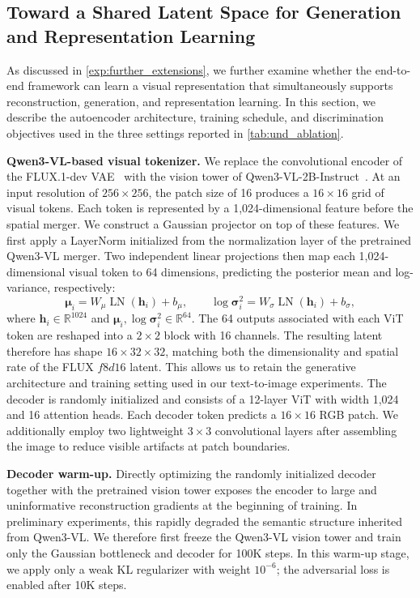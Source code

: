 \subsection{Toward a Shared Latent Space for Generation and Representation Learning}
\label{app:und}

As discussed in \cref{exp:further_extensions}, we further examine whether the
end-to-end framework can learn a visual representation that simultaneously
supports reconstruction, generation, and representation learning. In this section, we
describe the autoencoder architecture, training schedule, and discrimination
objectives used in the three settings reported in
\cref{tab:und_ablation}.

\textbf{Qwen3-VL-based visual tokenizer.}
We replace the convolutional encoder of the FLUX.1-dev VAE~\cite{flux1} with the vision tower of Qwen3-VL-2B-Instruct~\cite{bai2025qwen3}. 
At an input resolution of \(256\times256\), the patch size of 16 produces a \(16\times16\) grid of visual tokens. Each token is represented by a 1,024-dimensional feature before the spatial merger.
We construct a Gaussian projector on top of these features. 
We first apply a LayerNorm initialized from the normalization layer of the pretrained Qwen3-VL merger. 
Two independent linear projections then map each 1,024-dimensional visual token to 64 dimensions, predicting the posterior mean and log-variance, respectively:
\begin{equation*}
    \boldsymbol{\mu}_i =
    W_{\mu}\operatorname{LN}(\mathbf{h}_i)+b_{\mu},
    \qquad
    \log\boldsymbol{\sigma}^{2}_i =
    W_{\sigma}\operatorname{LN}(\mathbf{h}_i)+b_{\sigma},
\end{equation*}
where \(\mathbf{h}_i\in\mathbb{R}^{1024}\) and
\(\boldsymbol{\mu}_i,\log\boldsymbol{\sigma}^{2}_i\in\mathbb{R}^{64}\).
The 64 outputs associated with each ViT token are reshaped into a \(2\times2\) block with 16 channels. 
The resulting latent therefore has shape \(16\times32\times32\), matching both the dimensionality and spatial rate of the FLUX \(f8d16\) latent. 
This allows us to retain the generative architecture and training setting used in our text-to-image experiments.
The decoder is randomly initialized and consists of a 12-layer ViT with width 1,024 and 16 attention heads. 
Each decoder token predicts a \(16\times16\) RGB patch. 
We additionally employ two lightweight \(3\times3\) convolutional layers after assembling the image to reduce visible artifacts at patch boundaries.

\textbf{Decoder warm-up.}
Directly optimizing the randomly initialized decoder together with the pretrained vision tower exposes the encoder to large and uninformative reconstruction gradients at the beginning of training. 
In preliminary experiments, this rapidly degraded the semantic structure inherited from Qwen3-VL. 
We therefore first freeze the Qwen3-VL vision tower and train only the Gaussian bottleneck and decoder for 100K steps.
In this warm-up stage, we apply only a weak KL regularizer with weight \(10^{-6}\); the adversarial loss is enabled after 10K steps. 

